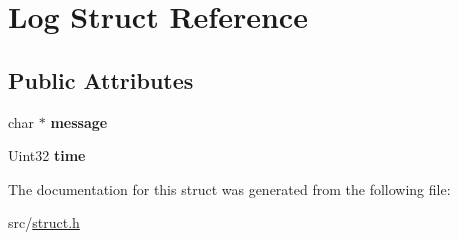 \hypertarget{struct_log}{}\section{Log Struct Reference}
\label{struct_log}
\subsection*{Public Attributes}
\begin{DoxyCompactItemize}
\item 
\mbox{\label{struct_log_ab01aa741c62b4cb10ed7b2ef3db468eb}} 
char $\ast$ {\bfseries message}
\item 
\mbox{\label{struct_log_a4e89fe06df8b031f8816c863bb588c23}} 
Uint32 {\bfseries time}
\end{DoxyCompactItemize}


The documentation for this struct was generated from the following file\+:\begin{DoxyCompactItemize}
\item 
src/\hyperlink{struct_8h}{struct.\+h}\end{DoxyCompactItemize}
